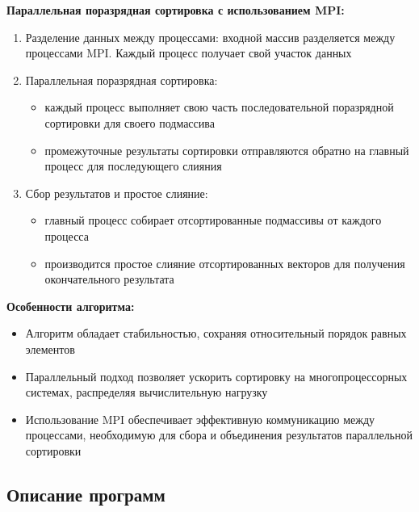 \documentclass[a4paper, 14pt]{article}
\theoremstyle{plain}
\begin{document}
\textbf{Параллельная поразрядная сортировка с использованием MPI:}
\vspace{-1em}
\begin{enumerate}[leftmargin=3em]
	\setlength\itemsep{0cm}
	\item Разделение данных между процессами: входной массив разделяется между процессами MPI. Каждый процесс получает свой участок данных
	\item Параллельная поразрядная сортировка:
	\begin{itemize}
		\setlength\itemsep{0cm}
		\item каждый процесс выполняет свою часть последовательной поразрядной сортировки для своего подмассива
		\item промежуточные результаты сортировки отправляются обратно на главный процесс для последующего слияния
	\end{itemize}
	\item Сбор результатов и простое слияние: 
	\vspace{-0.3cm}
	\begin{itemize}
		\setlength\itemsep{0cm}
		\item главный процесс собирает отсортированные подмассивы от каждого процесса
		\item производится простое слияние отсортированных векторов для получения окончательного результата
	\end{itemize}
\end{enumerate}


\textbf{Особенности алгоритма:}
\vspace{-1em}
	\begin{itemize}[leftmargin=3em]
		\setlength\itemsep{0cm}
		\item Алгоритм обладает стабильностью, сохраняя относительный порядок равных элементов
		\item Параллельный подход позволяет ускорить сортировку на многопроцессорных системах, распределяя вычислительную нагрузку
		\item Использование MPI обеспечивает эффективную коммуникацию между процессами, необходимую для сбора и объединения результатов параллельной сортировки
		\end{itemize}
\newpage
\subsection*{\centering Описание программ}
\end{document}
